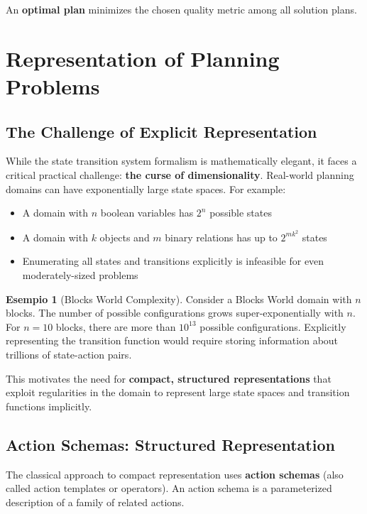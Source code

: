 \documentclass[11pt,a4paper]{article}
\theoremstyle{definition}
\newtheorem{example}{Esempio}[section]
\theoremstyle{plain}
\theoremstyle{remark}
\begin{document}
An \textbf{optimal plan} minimizes the chosen quality metric among all solution plans.

\newpage

\section{Representation of Planning Problems}

\subsection{The Challenge of Explicit Representation}

While the state transition system formalism is mathematically elegant, it faces a critical practical challenge: \textbf{the curse of dimensionality}. Real-world planning domains can have exponentially large state spaces. For example:

\begin{itemize}
    \item A domain with $n$ boolean variables has $2^n$ possible states
    \item A domain with $k$ objects and $m$ binary relations has up to $2^{mk^2}$ states
    \item Enumerating all states and transitions explicitly is infeasible for even moderately-sized problems
\end{itemize}

\begin{example}[Blocks World Complexity]
Consider a Blocks World domain with $n$ blocks. The number of possible configurations grows super-exponentially with $n$. For $n=10$ blocks, there are more than $10^{13}$ possible configurations. Explicitly representing the transition function would require storing information about trillions of state-action pairs.
\end{example}

This motivates the need for \textbf{compact, structured representations} that exploit regularities in the domain to represent large state spaces and transition functions implicitly.

\subsection{Action Schemas: Structured Representation}

The classical approach to compact representation uses \textbf{action schemas} (also called action templates or operators). An action schema is a parameterized description of a family of related actions.
\end{document}
